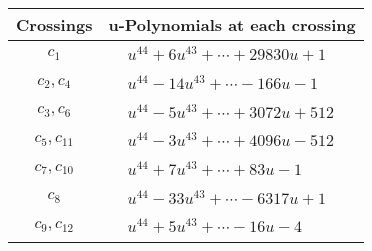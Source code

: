 \documentclass[1p]{elsarticle_modified}
\theoremstyle{definition}
\begin{document}
\begin{tabular}{m{50pt}|m{274pt}}
Crossings & \hspace{64pt}u-Polynomials at each crossing \\
\hline $$\begin{aligned}c_{1}\end{aligned}$$&$\begin{aligned}
&u^{44}+6 u^{43}+\cdots+29830 u+1
\end{aligned}$\\
\hline $$\begin{aligned}c_{2},c_{4}\end{aligned}$$&$\begin{aligned}
&u^{44}-14 u^{43}+\cdots-166 u-1
\end{aligned}$\\
\hline $$\begin{aligned}c_{3},c_{6}\end{aligned}$$&$\begin{aligned}
&u^{44}-5 u^{43}+\cdots+3072 u+512
\end{aligned}$\\
\hline $$\begin{aligned}c_{5},c_{11}\end{aligned}$$&$\begin{aligned}
&u^{44}-3 u^{43}+\cdots+4096 u-512
\end{aligned}$\\
\hline $$\begin{aligned}c_{7},c_{10}\end{aligned}$$&$\begin{aligned}
&u^{44}+7 u^{43}+\cdots+83 u-1
\end{aligned}$\\
\hline $$\begin{aligned}c_{8}\end{aligned}$$&$\begin{aligned}
&u^{44}-33 u^{43}+\cdots-6317 u+1
\end{aligned}$\\
\hline $$\begin{aligned}c_{9},c_{12}\end{aligned}$$&$\begin{aligned}
&u^{44}+5 u^{43}+\cdots-16 u-4
\end{aligned}$\\
\hline
\end{tabular}\\~\\
\newpage\renewcommand{\arraystretch}{1}
\end{document}
